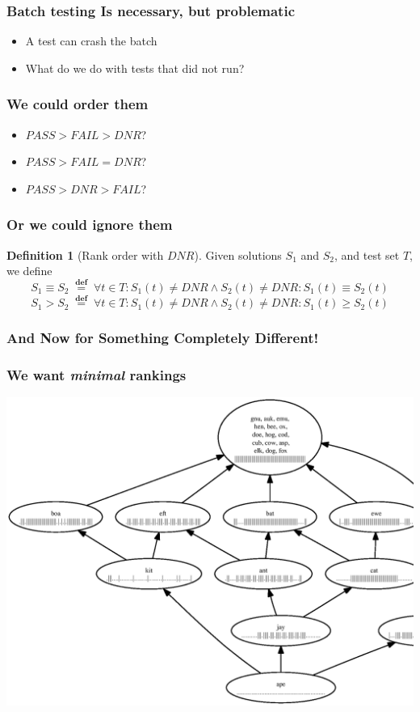 \documentclass[svgnames,14pt]{beamer}
\newcommand\dnr{\ensuremath{\mathit{DNR}}}
\newcommand\fail{\mathit{FAIL}}
\newcommand\pass{\mathit{PASS}}
\newcommand\defined{\mathrel{\;\stackrel{\scriptscriptstyle\mathbf{def}}{=}\;}}
\theoremstyle{definition}
\newtheorem{defn}{Definition}
\begin{document}
\begin{frame}
\frametitle{Batch testing Is necessary, but problematic}
\begin{itemize}
\item A test can crash the batch
\item What do we do with tests that did not run?
\end{itemize}
\end{frame}

\begin{frame}
\frametitle{We could order them}
\begin{itemize}
\item $\pass>\fail>\dnr$?
\item $\pass>\fail=\dnr$?
\item $\pass>\dnr>\fail$?
\end{itemize}
\end{frame}

\begin{frame}
\frametitle{Or we could ignore them}
\begin{defn}[Rank order with \dnr]
Given solutions $S_1$ and $S_2$, and test set $T$, we define
$$S_1 \equiv S_2 \defined \forall t \in T : S_1(t) \neq \dnr \wedge S_2(t) \neq \dnr : S_1(t) \equiv S_2(t)$$
$$S_1 > S_2 \defined \forall t \in T : S_1(t) \neq \dnr \wedge S_2(t) \neq \dnr : S_1(t) \geq S_2(t)$$
\end{defn}
\end{frame}

\begin{frame}
\frametitle{And Now for Something Completely Different!}
\end{frame}

\begin{frame}
\frametitle{We want \emph{minimal} rankings}
\centerline{\includegraphics[height=0.9\textheight]{fail.ps}}
\end{frame}
\end{document}
